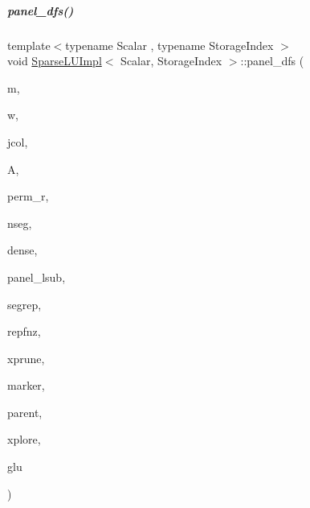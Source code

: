 \mbox{\label{group___sparse_l_u___module_acaf62fda387ea03e9caa2734e4e7b0c9}} 
\subparagraph{\texorpdfstring{panel\+\_\+dfs()}{panel\_dfs()}}
{\footnotesize\ttfamily template$<$typename Scalar , typename Storage\+Index $>$ \\
void \hyperlink{group___sparse_l_u___module_class_eigen_1_1internal_1_1_sparse_l_u_impl}{Sparse\+L\+U\+Impl}$<$ Scalar, Storage\+Index $>$\+::panel\+\_\+dfs (\begin{DoxyParamCaption}\item[{const \hyperlink{namespace_eigen_a62e77e0933482dafde8fe197d9a2cfde}{Index}}]{m,  }\item[{const \hyperlink{namespace_eigen_a62e77e0933482dafde8fe197d9a2cfde}{Index}}]{w,  }\item[{const \hyperlink{namespace_eigen_a62e77e0933482dafde8fe197d9a2cfde}{Index}}]{jcol,  }\item[{\hyperlink{group___sparse_core___module}{Matrix\+Type} \&}]{A,  }\item[{\hyperlink{group___core___module}{Index\+Vector} \&}]{perm\+\_\+r,  }\item[{\hyperlink{namespace_eigen_a62e77e0933482dafde8fe197d9a2cfde}{Index} \&}]{nseg,  }\item[{\hyperlink{group___core___module}{Scalar\+Vector} \&}]{dense,  }\item[{\hyperlink{group___core___module}{Index\+Vector} \&}]{panel\+\_\+lsub,  }\item[{\hyperlink{group___core___module}{Index\+Vector} \&}]{segrep,  }\item[{\hyperlink{group___core___module}{Index\+Vector} \&}]{repfnz,  }\item[{\hyperlink{group___core___module}{Index\+Vector} \&}]{xprune,  }\item[{\hyperlink{group___core___module}{Index\+Vector} \&}]{marker,  }\item[{\hyperlink{group___core___module}{Index\+Vector} \&}]{parent,  }\item[{\hyperlink{group___core___module}{Index\+Vector} \&}]{xplore,  }\item[{\hyperlink{struct_eigen_1_1internal_1_1_l_u___global_l_u__t}{Global\+L\+U\+\_\+t} \&}]{glu }\end{DoxyParamCaption})\hspace{0.3cm}{\ttfamily [protected]}}



